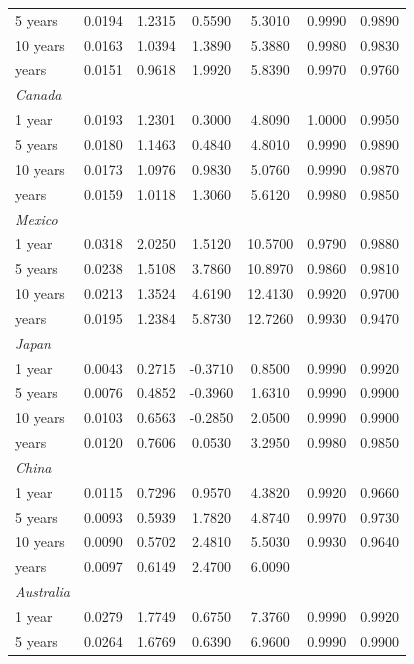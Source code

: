 \documentclass[12pt,bibliography=totoc]{article}
\begin{document}
\begin{appendices}
\begin{table}[H]
\begin{tabular}{l c c c c c c}
5 years	&	0.0194	&	1.2315	&	0.5590	&	5.3010	&	0.9990	&	0.9890	\\
10 years	&	0.0163	&	1.0394	&	1.3890	&	5.3880	&	0.9980	&	0.9830	\\
\medskip
30 years	&	0.0151	&	0.9618	&	1.9920	&	5.8390	&	0.9970	&	0.9760	\\
\textit{Canada}	&		&		&		&		&		&		\\
1 year	&	0.0193	&	1.2301	&	0.3000	&	4.8090	&	1.0000	&	0.9950	\\
5 years	&	0.0180	&	1.1463	&	0.4840	&	4.8010	&	0.9990	&	0.9890	\\
10 years	&	0.0173	&	1.0976	&	0.9830	&	5.0760	&	0.9990	&	0.9870	\\
\medskip													
30 years	&	0.0159	&	1.0118	&	1.3060	&	5.6120	&	0.9980	&	0.9850	\\
\textit{Mexico}	&		&		&		&		&		&		\\
1 year	&	0.0318	&	2.0250	&	1.5120	&	10.5700	&	0.9790	&	0.9880	\\
5 years	&	0.0238	&	1.5108	&	3.7860	&	10.8970	&	0.9860	&	0.9810	\\
10 years	&	0.0213	&	1.3524	&	4.6190	&	12.4130	&	0.9920	&	0.9700	\\
\medskip
30 years	&	0.0195	&	1.2384	&	5.8730	&	12.7260	&	0.9930	&	0.9470	\\
\textit{Japan}	&		&		&		&		&		&		\\
1 year	&	0.0043	&	0.2715	&	-0.3710	&	0.8500	&	0.9990	&	0.9920	\\
5 years	&	0.0076	&	0.4852	&	-0.3960	&	1.6310	&	0.9990	&	0.9900	\\
10 years	&	0.0103	&	0.6563	&	-0.2850	&	2.0500	&	0.9990	&	0.9900	\\
\medskip													
30 years	&	0.0120	&	0.7606	&	0.0530	&	3.2950	&	0.9980	&	0.9850	\\
\textit{China}	&		&		&		&		&		&		\\
1 year	&	0.0115	&	0.7296	&	0.9570	&	4.3820	&	0.9920	&	0.9660	\\
5 years	&	0.0093	&	0.5939	&	1.7820	&	4.8740	&	0.9970	&	0.9730	\\
10 years	&	0.0090	&	0.5702	&	2.4810	&	5.5030	&	0.9930	&	0.9640	\\
\medskip													
30 years	&	0.0097	&	0.6149	&	2.4700	&	6.0090	&		&		\\
\textit{Australia}	&		&		&		&		&		&		\\
1 year	&	0.0279	&	1.7749	&	0.6750	&	7.3760	&	0.9990	&	0.9920	\\
5 years	&	0.0264	&	1.6769	&	0.6390	&	6.9600	&	0.9990	&	0.9900	\\

\end{tabular}
\end{table}
\end{appendices}
\end{document}
